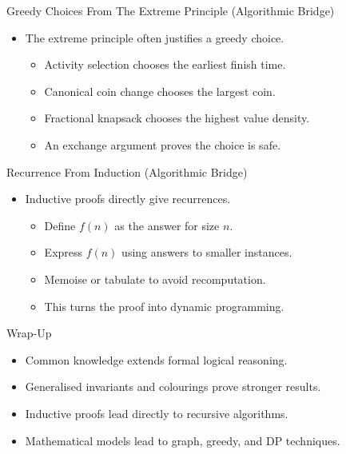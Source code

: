 \documentclass{beamer}
\begin{document}
\begin{frame}{Greedy Choices From The Extreme Principle (Algorithmic Bridge)}
    \pause
    \begin{itemize}
        \item The extreme principle often justifies a greedy choice.
            \begin{itemize}
                \item Activity selection chooses the earliest finish time.
                \item Canonical coin change chooses the largest coin.
                \item Fractional knapsack chooses the highest value density.
                \item An exchange argument proves the choice is safe.
            \end{itemize}
    \end{itemize}
\end{frame}

\begin{frame}{Recurrence From Induction (Algorithmic Bridge)}
    \pause
    \begin{itemize}
        \item Inductive proofs directly give recurrences.
            \begin{itemize}
                \item Define $f(n)$ as the answer for size $n$.
                \item Express $f(n)$ using answers to smaller instances.
                \item Memoise or tabulate to avoid recomputation.
                \item This turns the proof into dynamic programming.
            \end{itemize}
    \end{itemize}
\end{frame}

\begin{frame}{Wrap-Up}
    \pause
    \begin{itemize}
        \item Common knowledge extends formal logical reasoning.
        \item Generalised invariants and colourings prove stronger results.
        \item Inductive proofs lead directly to recursive algorithms.
        \item Mathematical models lead to graph, greedy, and DP techniques.
    \end{itemize}
\end{frame}
\end{document}
